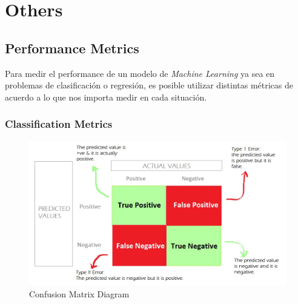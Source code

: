 \section{Others}

\subsection{Performance Metrics} 

Para medir el performance de un modelo de \textit{Machine Learning} ya sea en problemas de clasificación o regresión, es posible utilizar distintas métricas de acuerdo a lo que nos importa medir en cada situación. 

\subsubsection{Classification Metrics}

\begin{figure}[H]
    \center
    \includegraphics[scale=0.25]{notebooks/Others/img/confusion_matrix_diagram.png}
    \caption{Confusion Matrix Diagram}
\end{figure}


